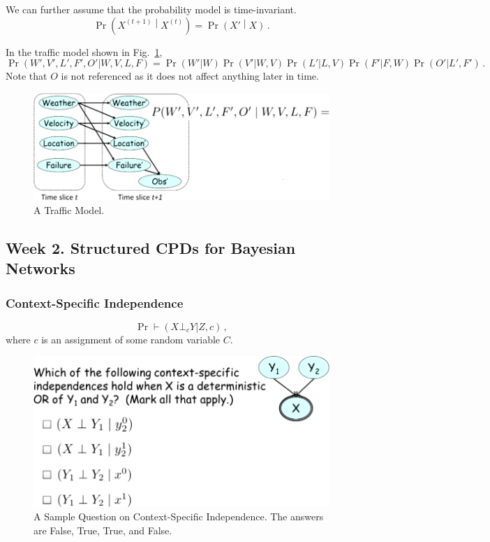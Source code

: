 \documentclass[12pt]{article}
\begin{document}
We can further assume that the probability model is time-invariant.
\begin{equation*}
  \Pr\left(X^{(t+1)} \middle\vert X^{(t)} \right) = \Pr\left(X' \middle\vert X \right) \, .
\end{equation*}

In the traffic model shown in Fig.~\ref{fig:example_template_transit_model},
\begin{equation*}
  \Pr(W', V', L', F', O' | W, V, L, F) = \Pr(W'|W) \Pr(V'|W, V) \Pr(L' | L, V) \Pr(F' | F, W) \Pr(O' | L', F') \, .
\end{equation*}
Note that $O$ is not referenced as it does not affect anything later in time.

\begin{figure}[H]
\centering
\includegraphics[width=6.5in]{graphics/example_template_transit_model.png}
\caption{A Traffic Model.}
\label{fig:example_template_transit_model}
\end{figure}

\subsection{Week 2. Structured CPDs for Bayesian Networks}

\subsubsection{Context-Specific Independence}
\begin{equation*}
  \Pr \vdash (X \bot_c Y | Z, c) \, ,
\end{equation*}
where $c$ is an assignment of some random variable $C$.

\begin{figure}[H]
\centering
\includegraphics[width=5.5in]{graphics/example_context_specific_independence.png}
\caption{A Sample Question on Context-Specific Independence.  The answers are False, True, True, and False.}
\label{fig:example_context_specific_independence}
\end{figure}
\end{document}
